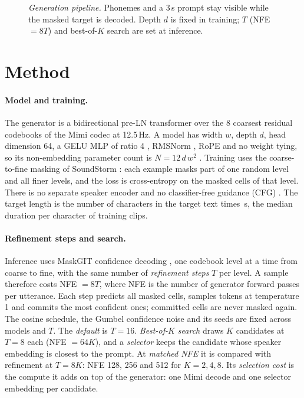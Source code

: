 \begin{figure}[t]
  \centering
  \resizebox{0.95\linewidth}{!}{}
  \caption{\emph{Generation pipeline.} Phonemes and a 3\,s prompt stay visible while the
  masked target is decoded. Depth $d$ is fixed in training; $T$ (NFE $=8T$) and best-of-$K$
  search are set at inference.}
  \label{fig:pipeline}
\end{figure}

\section{Method}
\label{sec:method}

\paragraph{Model and training.}
The generator is a bidirectional pre-LN transformer \citep{preln} over the 8 coarsest residual
codebooks of the Mimi codec \citep{moshi} at 12.5\,Hz. A model has width $w$, depth $d$, head
dimension 64, a GELU MLP of ratio 4 \citep{gelu}, RMSNorm \citep{rmsnorm}, RoPE \citep{rope}
and no weight tying, so its non-embedding parameter count is $N = 12\,d\,w^{2}$
\citep{kaplan}. Training uses the coarse-to-fine masking of SoundStorm \citep{soundstorm}:
each example masks part of one random level and all finer levels, and the loss is
cross-entropy on the masked cells of that level. There is no separate
speaker encoder and no classifier-free guidance (CFG) \citep{cfg}. The target length is the
number of characters in the target text times \Nsecperchar\,s, the median duration per
character of training clips.

\paragraph{Refinement steps and search.}
Inference uses MaskGIT confidence decoding \citep{maskgit}, one codebook level at a time from
coarse to fine, with the same number of \emph{refinement steps} $T$ per level. A sample
therefore costs NFE $=8T$, where NFE is the number of generator forward passes per
utterance. Each step predicts all masked cells, samples tokens at temperature 1 and commits
the most confident ones; committed cells are never masked again. The cosine schedule, the
Gumbel confidence noise and its seeds are fixed across models and $T$. The \emph{default} is $T{=}16$.
\emph{Best-of-$K$ search} draws $K$ candidates at $T{=}8$ each (NFE $=64K$), and a
\emph{selector} keeps the candidate whose speaker embedding is closest to the prompt. At
\emph{matched NFE} it is compared with refinement at $T{=}8K$: NFE 128, 256 and 512 for
$K{=}2,4,8$. Its \emph{selection cost} is the compute it adds on top of the generator:
one Mimi decode and one selector embedding per candidate.

